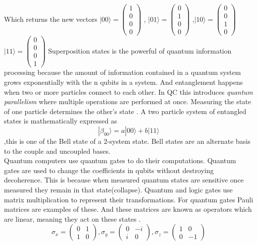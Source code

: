 \documentclass[12pt, a4paper]{Assignment}
\begin{document}
Which returns the new vectors $|00\rangle =	\begin{pmatrix}
	1\\0\\0\\0
\end{pmatrix}$ , $|01\rangle =	\begin{pmatrix}
0\\1\\0\\0
\end{pmatrix}$ ,$|10\rangle =	\begin{pmatrix}
0\\0\\1\\0
\end{pmatrix}$
$|11\rangle =	\begin{pmatrix}
	0\\0\\0\\1
\end{pmatrix}$
Superposition states is the powerful of quantum information processing because the 
amount of information contained in a quantum system grows exponentially with the n  qubits in a system.
And entanglement happens when two or more particles connect to each other.
In QC this introduces \textit{quantum parallelism} where multiple operations are performed at once.
Measuring the state of one particle determines the other's state \cite{mcintyre_quantum_2012}.
A two particle system of entangled states is mathematically expressed as \begin{equation}|\beta_{00} \rangle = a|00\rangle + b|11\rangle\end{equation}
,this is one of the Bell state of a 2-system state.
Bell states are an alternate basis to the couple and uncoupled bases\cite{mcintyre_quantum_2012}.\\
Quantum computers use quantum gates to do their computations\cite{AndrewSteane}.
Quantum gates are used to change the coefficients in qubits without destroying decoherence.
This is because when measured quantum states are sensitive once measured they remain in that state(collapse).
Quantum and logic gates use matrix multiplication to represent their transformations.
For quantum gates Pauli matrices are examples of these.
And these matrices are known as operators which are linear, meaning they act on these states \cite{AndrewSteane,mcintyre_quantum_2012}.
\begin{equation}
\sigma_x =\begin{pmatrix}
	0&1\\1&0
	\end{pmatrix},
	\sigma_y =\begin{pmatrix}
		0&-i\\i&0
	\end{pmatrix},\sigma_z =\begin{pmatrix}
	1&0\\0&-1
	\end{pmatrix}
\end{equation}
\end{document}
